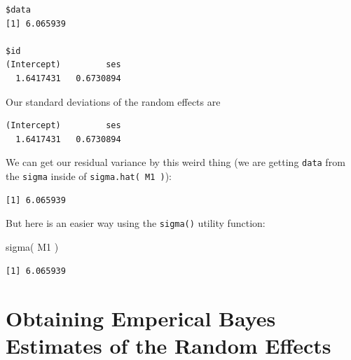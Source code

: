 \documentclass[
  letterpaper,
  DIV=11,
  numbers=noendperiod]{scrreprt}
\newenvironment{Shaded}{\begin{snugshade}}{\end{snugshade}}
\newcommand{\FunctionTok}[1]{\textcolor[rgb]{0.02,0.16,0.49}{#1}}
\newcommand{\NormalTok}[1]{\textcolor[rgb]{0.00,0.44,0.13}{#1}}
\newcommand{\SpecialCharTok}[1]{\textcolor[rgb]{0.25,0.44,0.63}{#1}}
\begin{document}
\begin{verbatim}
$data
[1] 6.065939

$id
(Intercept)         ses 
  1.6417431   0.6730894 
\end{verbatim}

Our standard deviations of the random effects are

\begin{Shaded}
\end{Shaded}

\begin{verbatim}
(Intercept)         ses 
  1.6417431   0.6730894 
\end{verbatim}

We can get our residual variance by this weird thing (we are getting
\texttt{data} from the \texttt{sigma} inside of
\texttt{sigma.hat(\ M1\ )}):

\begin{Shaded}
\end{Shaded}

\begin{verbatim}
[1] 6.065939
\end{verbatim}

But here is an easier way using the \texttt{sigma()} utility function:

\begin{Shaded}
\begin{Highlighting}[]
\FunctionTok{sigma}\NormalTok{( M1 )}
\end{Highlighting}
\end{Shaded}

\begin{verbatim}
[1] 6.065939
\end{verbatim}

\hypertarget{obtaining-emperical-bayes-estimates-of-the-random-effects}{%
\section{Obtaining Emperical Bayes Estimates of the Random
Effects}\label{obtaining-emperical-bayes-estimates-of-the-random-effects}}
\end{document}
